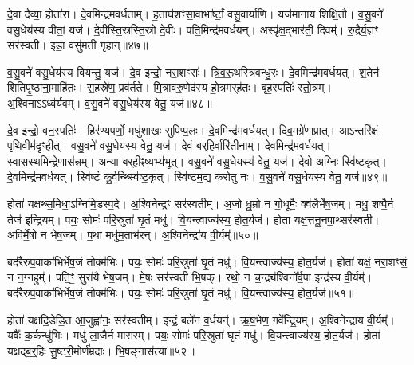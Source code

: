 दे॒वा दैव्या॒ होता॑रा।
दे॒वमिन्द्र॑मवर्धताम्।
ह॒ताघ॑शꣳसा॒वा\-भा᳚र्ष्टां॒ वसु॒वार्या॑णि।
यज॑मानाय शिक्षि॒तौ।
व॒सु॒वने॑ वसु॒धेय॑स्य वीतां॒ यज॑।
दे॒वीस्ति॒स्रस्ति॒स्रो दे॒वीः।
पति॒मिन्द्र॑मवर्धयन्।
अस्पृ॑क्ष॒द्भार॑ती॒ दिवम्᳚।
रु॒द्रैर्य॒ज्ञꣳ सर॑स्वती।
इडा॒ वसु॑मती गृ॒हान्॥४७॥

व॒सु॒वने॑ वसु॒धेय॑स्य वियन्तु॒ यज॑।
दे॒व इन्द्रो॒ नरा॒शꣳसः॑।
त्रि॒व॒रू॒थस्त्रि॑वन्धु॒रः।
दे॒वमिन्द्र॑मवर्धयत्।
श॒तेन॑ शिति\-पृ॒ष्ठाना॒माहि॑तः।
स॒हस्रे॑ण॒ प्रव॑र्तते।
मि॒त्रावरु॒णेद॑स्य हो॒त्रमर्‌\mbox{}ह॑तः।
बृह॒स्पतिः॑ स्तो॒त्रम्।
अ॒श्विना\-ऽऽध्व॑र्यवम्।
व॒सु॒वने॑ वसु॒धेय॑स्य वेतु॒ यज॑॥४८॥

दे॒व इन्द्रो॒ वन॒स्पतिः॑।
हिर॑ण्यपर्णो॒ मधु॑शाखः सुपिप्प॒लः।
दे॒वमिन्द्र॑मवर्धयत्।
दिव॒मग्रे॑णाप्रात्।
आऽन्तरि॑क्षं पृथि॒वीम॑दृꣳहीत्।
व॒सु॒वने॑ वसु॒धेय॑स्य वेतु॒ यज॑।
दे॒वं ब॒र्॒हिर्वारि॑तीनाम्।
दे॒वमिन्द्र॑मवर्धयत्।
स्वा॒स॒स्थमिन्द्रे॒णा\-स॑न्नम्।
अ॒न्या ब॒र्॒हीꣴष्य॒भ्य॑\-भूत्।
व॒सु॒वने॑ वसु॒धेयस्य॑ वेतु॒ यज॑।
दे॒वो अ॒ग्निः स्वि॑ष्ट॒\-कृत्।
दे॒वमिन्द्र॑मवर्धयत्।
स्वि॑ष्टं कु॒र्वन्थ्स्वि॑ष्ट॒\-कृत्।
स्वि॑ष्टम॒द्य क॑रोतु नः।
व॒सु॒वने॑ वसु॒धेय॑स्य वेतु॒ यज॑॥४९॥

होता॑ यक्षथ्स॒मिधा॒\-ऽग्निमि॒डस्प॒दे।
अ॒श्विनेन्द्र॒ꣳ॒ सर॑स्वतीम्।
अ॒जो धू॒म्रो न गो॒धूमैः॒ क्व॑लैर्भेष॒जम्।
मधु॒ शष्पै॒र्न तेज॑ इन्द्रि॒यम्।
पयः॒ सोमः॑ परि॒स्रुता॑ घृ॒तं मधु॑।
वि॒यन्त्वाज्य॑स्य॒ होत॒र्यज॑।
होता॑ यक्ष॒त्तनू॒नपा॒थ्सर॑स्वती।
अवि॑र्मे॒षो न भे॑ष॒जम्।
प॒था मधु॑म॒ताभ॑रन्।
अ॒श्विनेन्द्रा॑य वी॒र्यम्᳚॥५०॥

बद॑रैरुप॒वाका॑भिर्भेष॒जं तोक्म॑भिः।
पयः॒ सोमः॑ परि॒स्रुता॑ घृ॒तं मधु॑।
वि॒यन्त्वाज्य॑स्य॒ होत॒र्यज॑।
होता॑ यक्षं॒ नरा॒शꣳसं॒ न न॒ग्नहुम्᳚।
पति॒ꣳ॒ सुरा॑यै भेष॒जम्।
मे॒षः सर॑स्वती भि॒षक्।
रथो॒ न च॒न्द्र्य॑श्विनो᳚र्व॒पा इन्द्र॑स्य वी॒र्यम्᳚।
बद॑रैरुप॒वाका॑भिर्भेष॒जं तोक्म॑भिः।
पयः॒ सोमः॑ परि॒स्रुता॑ घृ॒तं मधु॑।
वि॒यन्त्वाज्य॑स्य॒ होत॒र्यज॑॥५१॥

होता॑ यक्षदि॒डेडि॒त आ॒जुह्वा॑नः॒ सर॑स्वतीम्।
इन्द्रं॒ बले॑न व॒र्धयन्॑।
ऋ॒ष॒भेण॒ गवे᳚न्द्रि॒यम्।
अ॒श्विनेन्द्रा॑य वी॒र्यम्᳚।
यवैः᳚ क॒र्कन्धु॑भिः।
मधु॑ ला॒जैर्न मास॑रम्।
पयः॒ सोमः॑ परि॒स्रुता॑ घृ॒तं मधु॑।
वि॒यन्त्वाज्य॑स्य॒ होत॒र्यज॑।
होता॑ यक्षद्ब॒र्॒हिः सु॒ष्टरी॒मोर्ण॑म्रदाः।
भि॒षङ्नास॑त्या॥५२॥

